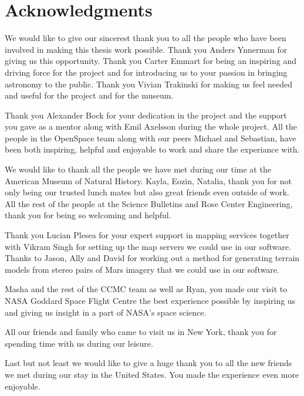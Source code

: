 \cleardoublepage
{}
{}
\chapter*{Acknowledgments}

We would like to give our sincerest thank you to all the people who have been involved in making this thesis work possible. Thank you Anders Ynnerman for giving us this opportunity. Thank you Carter Emmart for being an inspiring and driving force for the project and for introducing us to your passion in bringing astronomy to the public. Thank you Vivian Trakinski for making us feel needed and useful for the project and for the museum.

Thank you Alexander Bock for your dedication in the project and the support you gave as a mentor along with Emil Axelsson during the whole project. All the people in the OpenSpace team along with our peers Michael and Sebastian, have been both inspiring, helpful and enjoyable to work and share the experiance with.

We would like to thank all the people we have met during our time at the American Museum of Natural History. Kayla, Eozin, Natalia, thank you for not only being our trusted lunch mates but also great friends even outside of work.
All the rest of the people at the Science Bulletins and Rose Center Engineering, thank you for being so welcoming and helpful.

Thank you Lucian Plesea for your expert support in mapping services together with Vikram Singh for setting up the map servers we could use in our software. Thanks to Jason, Ally and David for working out a method for generating terrain models from stereo pairs of Mars imagery that we could use in our software.

Masha and the rest of the CCMC team as well as Ryan, you made our visit to NASA Goddard Space Flight Centre the best experience possible by inspiring us and giving us insight in a part of NASA's space science.

All our friends and family who came to visit us in New York, thank you for spending time with us during our leisure.

Last but not least we would like to give a huge thank you to all the new friends we met during our stay in the United States. You made the experience even more enjoyable.

\newpage
